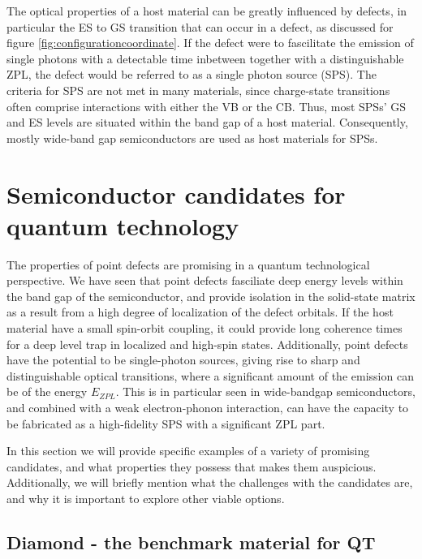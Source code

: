 The optical properties of a host material can be greatly influenced by defects, in particular the ES to GS transition that can occur in a defect, as discussed for figure \ref{fig:configurationcoordinate}. If the defect were to fascilitate the emission of single photons with a detectable time inbetween together with a distinguishable ZPL, the defect would be referred to as a single photon source (SPS). The criteria for SPS are not met in many materials, since charge-state transitions often comprise interactions with either the VB or the CB. Thus, most SPSs' GS and ES levels are situated within the band gap of a host material. Consequently, mostly wide-band gap semiconductors are used as host materials for SPSs.

\section{Semiconductor candidates for quantum technology}

The properties of point defects are promising in a quantum technological perspective. We have seen that point defects fasciliate deep energy levels within the band gap of the semiconductor, and provide isolation in the solid-state matrix as a result from a high degree of localization of the defect orbitals. If the host material have a small spin-orbit coupling, it could provide long coherence times for a deep level trap in localized and high-spin states. Additionally, point defects have the potential to be single-photon sources, giving rise to sharp and distinguishable optical transitions, where a significant amount of the emission can be of the energy $E_{ZPL}$. This is in particular seen in wide-bandgap semiconductors, and combined with a weak electron-phonon interaction, can have the capacity to be fabricated as a high-fidelity SPS with a significant ZPL part.

In this section we will provide specific examples of a variety of promising candidates, and what properties they possess that makes them auspicious. Additionally, we will briefly mention what the challenges with the candidates are, and why it is important to explore other viable options.

\subsection{Diamond - the benchmark material for QT}
\label{diamond}


